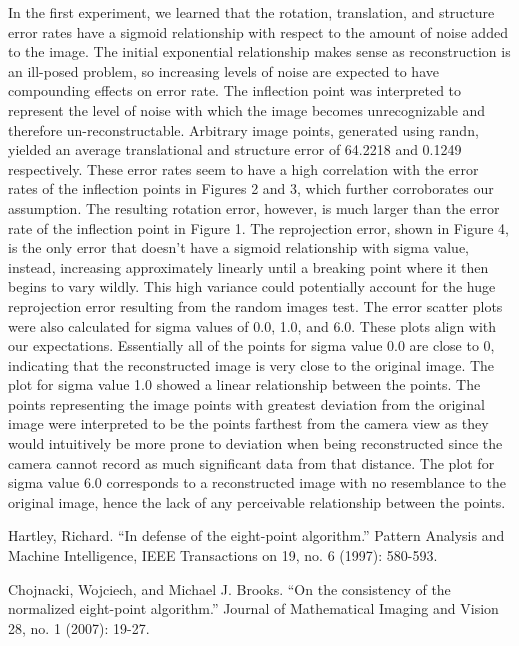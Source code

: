 \documentclass{article}
\begin{document}
In the first experiment, we learned that the rotation, translation, and structure error rates have a sigmoid relationship with respect to the amount of noise added to the image. The initial exponential relationship makes sense as reconstruction is an ill-posed problem, so increasing levels of noise are expected to have compounding effects on error rate. The inflection point was interpreted to represent the level of noise with which the image becomes unrecognizable and therefore un-reconstructable. Arbitrary image points, generated using randn, yielded an average translational and structure error of 64.2218 and 0.1249 respectively. These error rates seem to have a high correlation with the error rates of the inflection points in Figures 2 and 3, which further corroborates our assumption. The resulting rotation error, however, is much larger than the error rate of the inflection point in Figure 1. The reprojection error, shown in Figure 4, is the only error that doesn't have a sigmoid relationship with sigma value, instead, increasing approximately linearly until a breaking point where it then begins to vary wildly. This high variance could potentially account for the huge reprojection error resulting from the random images test.
The error scatter plots were also calculated for sigma values of 0.0, 1.0, and 6.0. These plots align with our expectations. Essentially all of the points for sigma value 0.0 are close to 0, indicating that the reconstructed image is very close to the original image. The plot for sigma value 1.0 showed a linear relationship between the points. The points representing the image points with greatest deviation from the original image were interpreted to be the points farthest from the camera view as they would intuitively be more prone to deviation when being reconstructed since the camera cannot record as much significant data from that distance. The plot for sigma value 6.0 corresponds to a reconstructed image with no resemblance to the original image, hence the lack of any perceivable relationship between the points.

\begin{thebibliography}{99}
	Hartley, Richard. ``In defense of the eight-point algorithm.'' Pattern Analysis and Machine Intelligence, IEEE Transactions on 19, no. 6 (1997): 580-593.

	Chojnacki, Wojciech, and Michael J. Brooks. ``On the consistency of the normalized eight-point algorithm.'' Journal of Mathematical Imaging and Vision 28, no. 1 (2007): 19-27.
\end{thebibliography}
\end{document}

